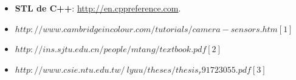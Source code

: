 \begin{itemize}
	\item \textbf{STL de C++}: \url{http://en.cppreference.com}.
\item $http://www.cambridgeincolour.com/tutorials/camera-sensors.htm [1]$
\item $http://ins.sjtu.edu.cn/people/mtang/textbook.pdf [2]$
\item $http://www.csie.ntu.edu.tw/~lyuu/theses/thesis_r91723055.pdf [3]$
\end{itemize}



